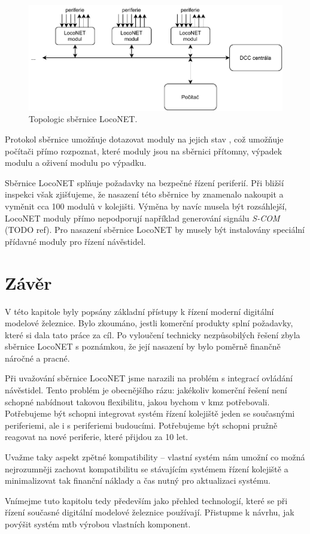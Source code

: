 \begin{figure}[ht!]
\includegraphics[width=\textwidth]{data/loconet.pdf}
\caption{Topologic sběrnice LocoNET.}
\label{fig:loconet-topology}
\end{figure}

Protokol sběrnice umožňuje dotazovat moduly na jejich stav \cite{loconet-specs},
což umožňuje počítači přímo rozpoznat, které moduly jsou na sběrnici přítomny,
výpadek modulu a oživení modulu po výpadku.

Sběrnice LocoNET splňuje požadavky na bezpečné řízení periferií. Při bližší
inspekci však zjišťujeme, že nasazení této sběrnice by znamenalo nakoupit a
vyměnit cca 100 modulů v kolejišti. Výměna by navíc musela být rozsáhlejší,
LocoNET moduly přímo nepodporují například generování signálu \textit{S-COM}
(TODO ref). Pro nasazení sběrnice LocoNET by musely být instalovány speciální
přídavné moduly pro řízení návěstidel.

\section{Závěr}

V této kapitole byly popsány základní přístupy k řízení moderní digitální
modelové železnice. Bylo zkoumáno, jestli komerční produkty splní požadavky,
které si dala tato práce za cíl. Po vyloučení technicky nezpůsobilých řešení
zbyla sběrnice LocoNET s poznámkou, že její nasazení by bylo poměrně finančně
náročné a pracné.

Při uvažování sběrnice LocoNET jsme narazili na problém s integrací ovládání
návěstidel. Tento problém je obecnějšího rázu: jakékoliv komerční řešení není
schopné nabídnout takovou flexibilitu, jakou bychom v \gls{kmz} potřebovali.
Potřebujeme být schopni integrovat systém řízení kolejiště jeden se současnými
periferiemi, ale i s periferiemi budoucími. Potřebujeme být schopni pružně
reagovat na nové periferie, které přijdou za 10 let.

Uvažme taky aspekt zpětné kompatibility – vlastní systém nám umožní co možná
nejrozumněji zachovat kompatibilitu se stávajícím systémem řízení kolejiště
a minimalizovat tak finanční náklady a čas nutný pro aktualizaci systému.

Vnímejme tuto kapitolu tedy především jako přehled technologií, které se
při řízení současné digitální modelové železnice používají. Přistupme k návrhu,
jak povýšit systém \gls{mtb} výrobou vlastních komponent.
